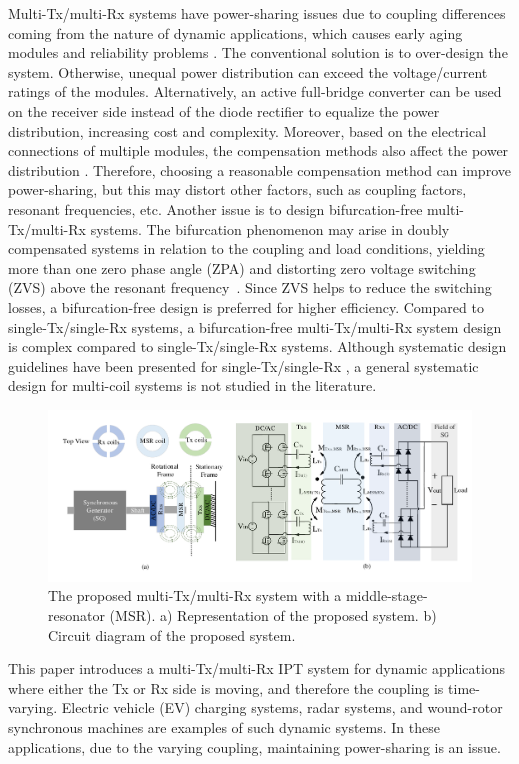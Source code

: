 \documentclass[journal]{IEEEtran}
\begin{document}
Multi-Tx/multi-Rx systems have power-sharing issues due to coupling differences coming from the nature of dynamic applications, which causes early aging modules and reliability problems \cite{current-sharing1,current-sharing2}. 
The conventional solution is to over-design the system. Otherwise, unequal power distribution can exceed the voltage/current ratings of the modules.
Alternatively, an active full-bridge converter can be used on the receiver side instead of the diode rectifier to equalize the power distribution, increasing cost and complexity.
Moreover, based on the electrical connections of multiple modules, the compensation methods also affect the power distribution \cite{current-sharingComp}.
Therefore, choosing a reasonable compensation method can improve power-sharing, but this may distort other factors, such as coupling factors, resonant frequencies, etc.
Another issue is to design bifurcation-free multi-Tx/multi-Rx systems.
The bifurcation phenomenon may arise in doubly compensated systems in relation to the coupling and load conditions, yielding more than one zero phase angle (ZPA) and distorting zero voltage switching (ZVS) above the resonant frequency~\cite{bifurcation}. 
Since ZVS helps to reduce the switching losses, a bifurcation-free design is preferred for higher efficiency. 
Compared to single-Tx/single-Rx systems, a bifurcation-free multi-Tx/multi-Rx system design is complex compared to single-Tx/single-Rx systems.
Although systematic design guidelines have been presented for single-Tx/single-Rx \cite{Aditya2019}, a general systematic design for multi-coil systems is not studied in the literature.
\begin{figure}[ht!]
\centering
	\includegraphics[width=0.95\linewidth]{2p4s_with_resonator_3.pdf}
	\caption{The proposed multi-Tx/multi-Rx system with a middle-stage-resonator (MSR). a) Representation of the proposed system. b) Circuit diagram of the proposed system.}
	\label{fig:system}
\end{figure}
This paper introduces a multi-Tx/multi-Rx IPT system for dynamic applications where either the Tx or Rx side is moving, and therefore the coupling is time-varying. Electric vehicle (EV) charging systems, radar systems, and wound-rotor synchronous machines are examples of such dynamic systems. In these applications, due to the varying coupling, maintaining power-sharing is an issue.
\end{document}
